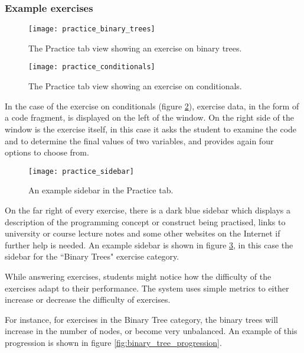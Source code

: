 \newpage
\subsubsection{Example exercises}
\begin{figure}[H]
\centering
\texttt{[image: practice\_binary\_trees]}
\caption{The Practice tab view showing an exercise on binary trees.}
\label{fig:practice_binary_trees}
\end{figure}

\begin{figure}[H]
\centering
\texttt{[image: practice\_conditionals]}
\caption{The Practice tab view showing an exercise on conditionals.}
\label{fig:practice_conditionals}
\end{figure}
\newpage

In the case of the exercise on conditionals (figure \ref{fig:practice_conditionals}), exercise data, in the form of a code fragment, is displayed on the left of the window. On the right side of the window is the exercise itself, in this case it asks the student to examine the code and to determine the final values of two variables, and provides again four options to choose from.

\begin{figure}[H]
\centering
\texttt{[image: practice\_sidebar]}
\caption{An example sidebar in the Practice tab.}
\label{fig:practice_sidebar}
\end{figure}

On the far right of every exercise, there is a dark blue sidebar which displays a description of the programming concept or construct being practised, links to university or course lecture notes and some other websites on the Internet if further help is needed. An example sidebar is shown in figure \ref{fig:practice_sidebar}, in this case the sidebar for the ``Binary Trees" exercise category.\newline

While answering exercises, students might notice how the difficulty of the exercises adapt to their performance. The system uses simple metrics to either increase or decrease the difficulty of exercises.\newline

For instance, for exercises in the Binary Tree category, the binary trees will increase in the number of nodes, or become very unbalanced. An example of this progression is shown in figure \ref{fig:binary_tree_progression}. \newline

